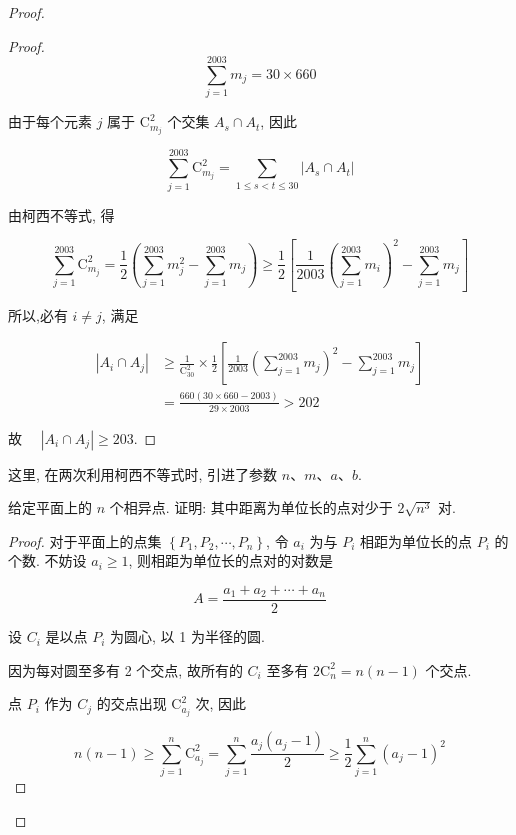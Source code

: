 \begin{proof}
\begin{example}
\begin{solution}
\begin{note}
\begin{proof}
	$$
	\sum_{j=1}^{2003} m_{j}=30 \times 660
	$$
	
	由于每个元素 $j$ 属于 $\mathrm{C}_{m_{j}}^{2}$ 个交集 $A_{s} \cap A_{t}$, 因此
	
	$$
	\sum_{j=1}^{2003} \mathrm{C}_{m_{j}}^{2}=\sum_{1 \leqslant s<t \leqslant 30}\left|A_{s} \cap A_{t}\right|
	$$
	
	由柯西不等式, 得
	
	$$
	\sum_{j=1}^{2003} \mathrm{C}_{m_{j}}^{2}=\frac{1}{2}\left(\sum_{j=1}^{2003} m_{j}^{2}-\sum_{j=1}^{2003} m_{j}\right) \geqslant \frac{1}{2}\left[\frac{1}{2003}\left(\sum_{j=1}^{2003} m_{i}\right)^{2}-\sum_{j=1}^{2003} m_{j}\right]
	$$
	
	所以,必有 $i \neq j$, 满足
	
	$$
	\begin{aligned}
	\left|A_{i} \cap A_{j}\right| & \geqslant \frac{1}{\mathrm{C}_{30}^{2}} \times \frac{1}{2}\left[\frac{1}{2003}\left(\sum_{j=1}^{2003} m_{j}\right)^{2}-\sum_{j=1}^{2003} m_{j}\right] \\
	& =\frac{660(30 \times 660-2003)}{29 \times 2003}>202
	\end{aligned}
	$$
	
	故 $\quad\left|A_{i} \cap A_{j}\right| \geqslant 203$.
\end{proof}
\begin{note}
	这里, 在两次利用柯西不等式时, 引进了参数 $n 、 m 、 a 、 b$.
\end{note}

\begin{example}
	给定平面上的 $n$ 个相异点. 证明: 其中距离为单位长的点对少于 $2 \sqrt{n^{3}}$ 对.
\end{example}
\begin{proof}
	对于平面上的点集 $\left\{P_{1}, P_{2}, \cdots, P_{n}\right\}$, 令 $a_{i}$ 为与 $P_{i}$ 相距为单位长的点 $P_{i}$ 的个数. 不妨设 $a_{i} \geqslant 1$, 则相距为单位长的点对的对数是
	
	$$
	A=\frac{a_{1}+a_{2}+\cdots+a_{n}}{2}
	$$
	
	设 $C_{i}$ 是以点 $P_{i}$ 为圆心, 以 1 为半径的圆.
	
	因为每对圆至多有 2 个交点, 故所有的 $C_{i}$ 至多有 $2 \mathrm{C}_{n}^{2}=n(n-1)$ 个交点.
	
	点 $P_{i}$ 作为 $C_{j}$ 的交点出现 $\mathrm{C}_{a_{j}}^{2}$ 次, 因此
	
	$$
	n(n-1) \geqslant \sum_{j=1}^{n} \mathrm{C}_{a_{j}}^{2}=\sum_{j=1}^{n} \frac{a_{j}\left(a_{j}-1\right)}{2} \geqslant \frac{1}{2} \sum_{j=1}^{n}\left(a_{j}-1\right)^{2}
	$$
	

\end{proof}
\end{note}
\end{solution}
\end{example}
\end{proof}
